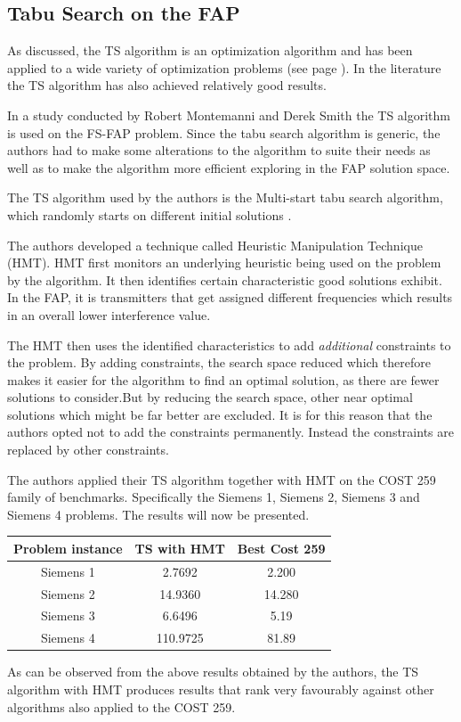 \subsection{Tabu Search on the FAP}
As discussed, the TS algorithm is an optimization algorithm and has been applied to a wide variety of optimization problems (see page \pageref{sec:TSIntroduction}). In the literature the TS algorithm has also achieved relatively good results.

In a study conducted by Robert Montemanni and Derek Smith \cite{TabuMontemanniSmith} the TS algorithm is used on the FS-FAP problem. Since the tabu search algorithm is generic, the authors had to make some alterations to the algorithm to suite their needs as well as to make the algorithm more efficient exploring in the FAP solution space.

The TS algorithm used by the authors is the Multi-start tabu search algorithm, which randomly starts on different initial solutions \cite{TabuMontemanniSmith}.

The authors developed a technique called Heuristic Manipulation Technique (HMT). HMT first monitors an underlying heuristic being used on the problem by the algorithm\cite{TabuMontemanniSmith}. It then identifies certain characteristic good solutions exhibit. In the FAP, it is transmitters that get assigned different frequencies which results in an overall lower interference value\cite{TabuMontemanniSmith}.

The HMT then uses the identified characteristics to add \emph{additional} constraints to the problem\cite{TabuMontemanniSmith}. By adding constraints, the search space reduced which therefore makes it easier for the algorithm to find an optimal solution, as there are fewer solutions to consider.But by reducing the search space, other near optimal solutions which might be far better are excluded\cite{TabuMontemanniSmith}. It is for this reason that the authors opted not to add the constraints permanently. Instead the constraints are replaced by other constraints\cite{TabuMontemanniSmith}.

The authors applied their TS algorithm together with HMT on the COST 259 family of benchmarks. Specifically the Siemens 1, Siemens 2, Siemens 3 and Siemens 4 problems.  The results will now be presented.
\begin{table}
\centering
	\begin{tabular}{| c | c | c |}
		\hline
		Problem instance & TS with HMT & Best Cost 259 \\ \hline
		Siemens 1 & 2.7692 & 2.200 \\ \hline
		Siemens 2 & 14.9360 & 14.280 \\ \hline
		Siemens 3 & 6.6496 & 5.19 \\ \hline
		Siemens 4 & 110.9725 & 81.89 \\ \hline
	\end{tabular}
\end{table}
As can be observed from the above results obtained by the authors, the TS algorithm with HMT produces results that rank very favourably against other algorithms also applied to the COST 259.

